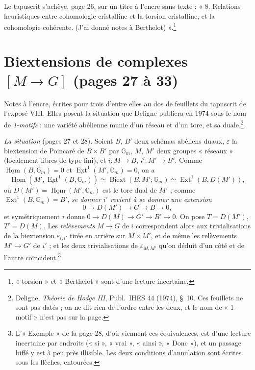 \documentclass[11pt,a4paper]{article}
\begin{document}
Le tapuscrit s'achève, page 26, sur un titre à l'encre sans texte :
« 8. Relations heuristiques entre cohomologie cristalline et la torsion
cristalline, et la cohomologie cohérente. (J'ai donné notes à
Berthelot) ».\footnote{« torsion » et « Berthelot » sont d'une lecture
incertaine.}

\section*{Biextensions de complexes $[M \to G]$ (pages 27 à 33)}

Notes à l'encre, écrites pour trois d'entre elles au dos de feuillets du
tapuscrit de l'exposé VIII. Elles posent la situation que Deligne publiera en 1974
sous le nom de \emph{1-motifs} : une variété abélienne
munie d'un réseau et d'un tore, et sa duale.\footnote{Deligne, \emph{Théorie de
Hodge III}, Publ.\ IHES 44 (1974), §~10. Ces feuillets ne sont pas datés ; on ne
dit rien de l'ordre entre les deux, et le nom de « 1-motif » n'est pas sur la
page.}

\emph{La situation} (pages 27 et 28). Soient $B$, $B'$ deux schémas abéliens
duaux, $\varepsilon$ la biextension de Poincaré de $B \times B'$ par
$\mathbb{G}_m$, $M$, $M'$ deux groupes « réseaux » (localement libres de type
fini), et $i\colon M \to B$, $i'\colon M' \to B'$. Comme
$\underline{\operatorname{Hom}}(B, \mathbb{G}_m) = 0$ et
$\underline{\operatorname{Ext}}^1(M', \mathbb{G}_m) = 0$, on a
\[ \operatorname{Hom}(M', \underline{\operatorname{Ext}}^1(B, \mathbb{G}_m))
\simeq \operatorname{Biext}(B, M'; \mathbb{G}_m) \simeq
\operatorname{Ext}^1(B, D(M')) , \]
où $D(M') = \underline{\operatorname{Hom}}(M', \mathbb{G}_m)$ est le tore dual de
$M'$ ; comme $\underline{\operatorname{Ext}}^1(B, \mathbb{G}_m) = B'$,
\emph{se donner $i'$ revient à se donner une extension}
\[ 0 \to D(M') \to G \to B \to 0 , \]
et symétriquement $i$ donne $0 \to D(M) \to G' \to B' \to 0$. On pose $T =
D(M')$, $T' = D(M)$. Les \emph{relèvements} $M \to G$ de $i$ correspondent alors
aux trivialisations de la biextension $\varepsilon_{i,i'}$ tirée en arrière sur
$M \times M'$, et de même les relèvements $M' \to G'$ de $i'$ ; et les deux
trivialisations de $\varepsilon_{M,M'}$ qu'on déduit d'un côté et de l'autre
coïncident.\footnote{L'« Exemple » de la page 28, d'où viennent ces équivalences,
est d'une lecture incertaine par endroits (« si », « vrai », « ainsi »,
« Donc »), et un passage biffé y est à peu près illisible. Les deux conditions
d'annulation sont écrites sous les flèches, entourées.}
\end{document}
